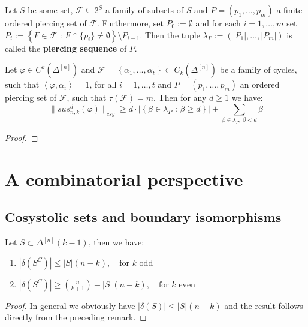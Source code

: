 \begin{defi}
Let \(S\) be some set, \(\mathcal{F}\subseteq 2^S\) a family of subsets of \(S\) and \(P=(p_1,\ldots,p_m)\) a finite ordered piercing set of \(\mathcal{F}\). Furthermore, set \(P_0:=\emptyset\) and for each \(i=1,\ldots,m\) set \(P_i:=\left\{F\in\mathcal{F}\text{ : }F\cap\{p_i\}\neq\emptyset\right\}\setminus P_{i-1}\). Then the tuple \(\lambda_P:=(|P_1|,\ldots,|P_m|)\) is called the \textbf{piercing sequence} of \(P\).
\end{defi}

\begin{prop}
Let \(\varphi\in C^k(\Delta^{[n]})\) and \(\mathcal{F}=\left\{\alpha_1,\ldots,\alpha_t\right\}\subset C_k(\Delta^{[n]})\) be a family of cycles, such that \(\left\langle\varphi,\alpha_i\right\rangle=1\), for all \(i=1,\ldots,t\) and \(P=(p_1,\ldots,p_m)\) an ordered piercing set of \(\mathcal{F}\), such that \(\tau(\mathcal{F})=m\). Then for any \(d\geq 1\) we have:
\[
\|sus_{n,k}^d(\varphi)\|_{csy}\geq d\cdot\left|\left\{\beta\in\lambda_P\text{ : }\beta\geq d\right\}\right|+\sum\limits_{\beta\in\lambda_P\text{, }\beta<d}\beta
\]
\begin{proof}

\end{proof}
\end{prop}


\section{A combinatorial perspective}

\subsection{Cosystolic sets and boundary isomorphisms}

\begin{lem}
Let \(S\subset\Delta^{[n]}(k-1)\), then we have:
\begin{enumerate}
\item \(|\delta(S^C)|\leq |S|(n-k),\quad\text{for }k\text{ odd}\)
\item \(|\delta(S^C)|\geq\binom{n}{k+1}-|S|(n-k),\quad\text{for }k\text{ even}\)
\end{enumerate}
\begin{proof}
In general we obviously have \(|\delta(S)|\leq |S|(n-k)\) and the result follows directly from the preceding remark.
\end{proof}
\end{lem}

